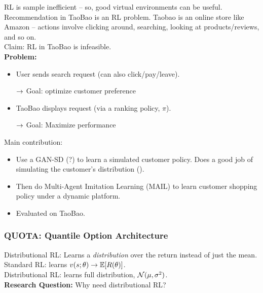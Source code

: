 RL is sample inefficient -- so, good virtual environments can be useful. \\

Recommendation in TaoBao is an RL problem. Taobao is an online store like Amazon -- actions involve clicking around, searching, looking at products/reviews, and so on. \\

Claim: RL in TaoBao is infeasible. \\

{\bf Problem:}
\begin{itemize}
    \item User sends search request (can also click/pay/leave).
    
    $\rightarrow$ Goal: optimize customer preference
    
    \item TaoBao displays request (via a ranking policy, $\pi$).
    
    $\rightarrow$ Goal: Maximize performance
\end{itemize}

Main contribution:
\begin{itemize}
    \item Use a GAN-SD (?) to learn a simulated customer policy. Does a good job of simulating the customer's distribution ().
    \item Then do Multi-Agent Imitation Learning (MAIL) to learn customer shopping policy under a dynamic platform.
    \item Evaluated on TaoBao.
\end{itemize}

\subsubsection{QUOTA: Quantile Option Architecture~\cite{zhang2018quota}}

Distributional RL: Learns a {\it distribution} over the return instead of just the mean. \\

Standard RL: learns $v(s;\theta) \rightarrow \mathbb{E}[R(\theta)]$. \\

Distributional RL: learns full distribution, $\mathcal{N}(\mu,\sigma^2)$. \\

{\bf Research Question:} Why need distributional RL?\\


